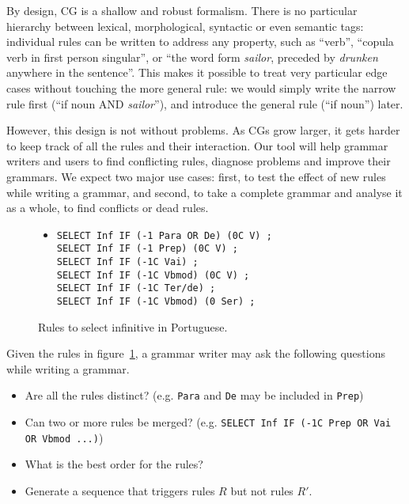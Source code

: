 By design, CG is a shallow and robust formalism. 
There is no particular hierarchy between lexical, morphological,
syntactic or even semantic tags: individual rules can be written to address any
property, such as ``verb'', ``copula verb in first person singular'',
or ``the word form \emph{sailor}, preceded by \emph{drunken} anywhere in the
sentence''. This makes it possible to treat very particular edge
cases without touching the more general rule: we would simply write
the narrow rule first (``if noun AND \emph{sailor}''), and introduce
the general rule (``if noun'') later.


However, this design is not without problems. As CGs grow larger, it
gets harder to keep track of all the rules and their interaction.
Our tool will help grammar writers and users to find conflicting
rules, diagnose problems and improve their grammars. 
We expect two major use cases: 
first, to test the effect of new rules while writing a grammar, and
second, to take a complete grammar and analyse it as a whole, to find
conflicts or dead rules.



\begin{figure}[t]
\begin{center}

\begin{itemize}
\item[]
\begin{verbatim}SELECT Inf IF (-1 Para OR De) (0C V) ;
SELECT Inf IF (-1 Prep) (0C V) ;
SELECT Inf IF (-1C Vai) ;
SELECT Inf IF (-1C Vbmod) (0C V) ;
SELECT Inf IF (-1C Ter/de) ;
SELECT Inf IF (-1C Vbmod) (0 Ser) ;
\end{verbatim}
\end{itemize}

\caption{Rules to select infinitive in Portuguese.}
\end{center}

\label{infrules}
\end{figure}



Given the rules in figure~\ref{infrules}, a grammar writer may ask the following questions while writing a grammar. 

\begin{itemize}
\item Are all the rules distinct? (e.g. \texttt{Para} and \texttt{De} may be included in \texttt{Prep})
\item Can two or more rules be merged? (e.g. \texttt{SELECT Inf IF (-1C Prep OR Vai OR Vbmod ...)})
\item What is the best order for the rules?
\item Generate a sequence that triggers rules $R$ but not rules $R'$. 
\end{itemize}

